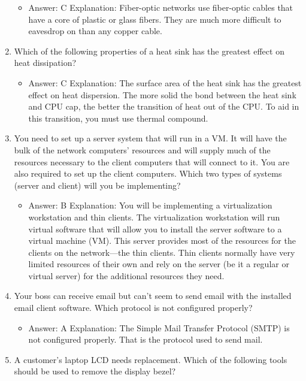 \documentclass{article}
\begin{document}
\begin{enumerate}
    \begin{itemize}
        \item Answer: C
Explanation: Fiber-optic networks use fiber-optic cables that have a core of plastic or
glass fibers. They are much more difficult to eavesdrop on than any copper cable.
    \end{itemize}
    \item Which of the following properties of a heat sink has the greatest
effect on heat dissipation?
    \begin{itemize}
        \item Answer: C
Explanation: The surface area of the heat sink has the greatest effect on heat dispersion.
The more solid the bond between the heat sink and CPU cap, the better the
transition of heat out of the CPU. To aid in this transition, you must use thermal
compound.
    \end{itemize}
    \item You need to set up a server system that will run in a VM. It will
have the bulk of the network computers’ resources and will supply
much of the resources necessary to the client computers that will
connect to it. You are also required to set up the client computers.
Which two types of systems (server and client) will you be implementing?
    \begin{itemize}
        \item Answer: B
Explanation: You will be implementing a virtualization workstation and thin clients.
The virtualization workstation will run virtual software that will allow you to install the
server software to a virtual machine (VM). This server provides most of the resources
for the clients on the network—the thin clients. Thin clients normally have very limited
resources of their own and rely on the server (be it a regular or virtual server) for the
additional resources they need.
    \end{itemize}
    \item Your boss can receive email but can’t seem to send email with the
installed email client software. Which protocol is not configured
properly?
    \begin{itemize}
        \item Answer: A
Explanation: The Simple Mail Transfer Protocol (SMTP) is not configured properly.
That is the protocol used to send mail.
    \end{itemize}
    \item A customer’s laptop LCD needs replacement. Which of the following
tools should be used to remove the display bezel?

\end{enumerate}
\end{document}
